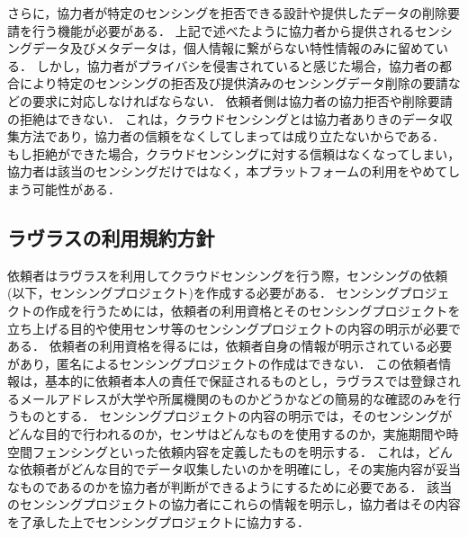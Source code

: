 さらに，協力者が特定のセンシングを拒否できる設計や提供したデータの削除要請を行う機能が必要がある．
上記で述べたように協力者から提供されるセンシングデータ及びメタデータは，個人情報に繋がらない特性情報のみに留めている．
しかし，協力者がプライバシを侵害されていると感じた場合，協力者の都合により特定のセンシングの拒否及び提供済みのセンシングデータ削除の要請などの要求に対応しなければならない．
依頼者側は協力者の協力拒否や削除要請の拒絶はできない．
これは，クラウドセンシングとは協力者ありきのデータ収集方法であり，協力者の信頼をなくしてしまっては成り立たないからである．
もし拒絶ができた場合，クラウドセンシングに対する信頼はなくなってしまい，協力者は該当のセンシングだけではなく，本プラットフォームの利用をやめてしまう可能性がある．

\subsection{ラヴラスの利用規約方針}
依頼者はラヴラスを利用してクラウドセンシングを行う際，センシングの依頼(以下，センシングプロジェクト)を作成する必要がある．
センシングプロジェクトの作成を行うためには，依頼者の利用資格とそのセンシングプロジェクトを立ち上げる目的や使用センサ等のセンシングプロジェクトの内容の明示が必要である．
依頼者の利用資格を得るには，依頼者自身の情報が明示されている必要があり，匿名によるセンシングプロジェクトの作成はできない．
この依頼者情報は，基本的に依頼者本人の責任で保証されるものとし，ラヴラスでは登録されるメールアドレスが大学や所属機関のものかどうかなどの簡易的な確認のみを行うものとする．
センシングプロジェクトの内容の明示では，そのセンシングがどんな目的で行われるのか，センサはどんなものを使用するのか，実施期間や時空間フェンシングといった依頼内容を定義したものを明示する．
これは，どんな依頼者がどんな目的でデータ収集したいのかを明確にし，その実施内容が妥当なものであるのかを協力者が判断ができるようにするために必要である．
該当のセンシングプロジェクトの協力者にこれらの情報を明示し，協力者はその内容を了承した上でセンシングプロジェクトに協力する．

